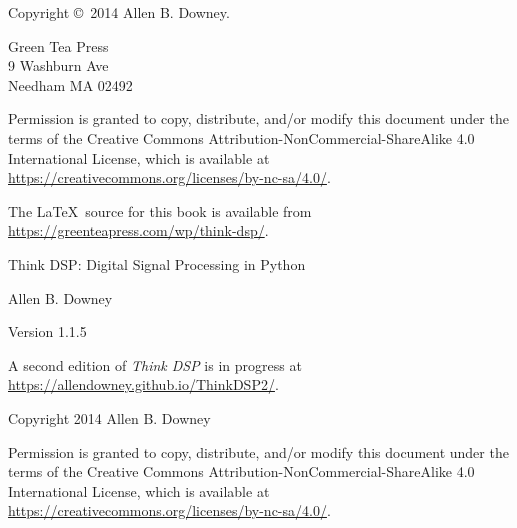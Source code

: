 \documentclass[12pt]{book}
\newcommand{\thetitle}{Think DSP}
\newcommand{\thesubtitle}{Digital Signal Processing in Python}
\newcommand{\theversion}{1.1.5}
\begin{document}
\begin{latexonly}
\begin{flushright}
\vfill

\end{flushright}


\pagebreak
\thispagestyle{empty}

Copyright \copyright ~2014 Allen B. Downey.


\vspace{0.2in}

\begin{flushleft}
Green Tea Press       \\
9 Washburn Ave \\
Needham MA 02492
\end{flushleft}

Permission is granted to copy, distribute, and/or modify this document
under the terms of the Creative Commons
Attribution-NonCommercial-ShareAlike 4.0 International License, which
is available at
\url{https://creativecommons.org/licenses/by-nc-sa/4.0/}.


The \LaTeX\ source for this book is available from
\url{https://greenteapress.com/wp/think-dsp/}.

\vspace{0.2in}

\end{latexonly}



\begin{htmlonly}


{\Large \thetitle: \thesubtitle}

{\large Allen B. Downey}

Version \theversion

A second edition of \emph{Think DSP} is in progress at
\url{https://allendowney.github.io/ThinkDSP2/}.

\vspace{0.25in}

Copyright 2014 Allen B. Downey

\vspace{0.25in}

Permission is granted to copy, distribute, and/or modify this document
under the terms of the Creative Commons
Attribution-NonCommercial-ShareAlike 4.0 International License,
which is available at
\url{https://creativecommons.org/licenses/by-nc-sa/4.0/}.

\setcounter{chapter}{-1}

\end{htmlonly}
\end{document}
